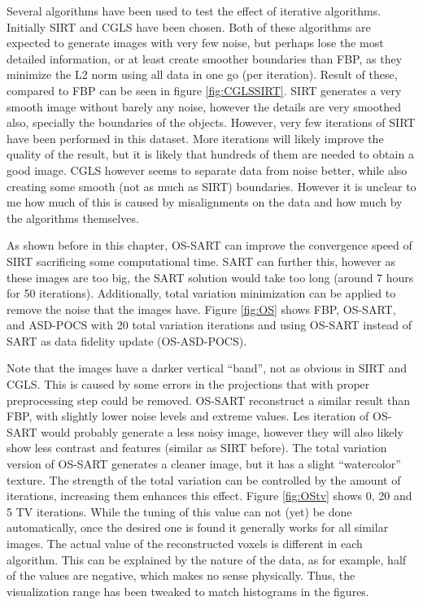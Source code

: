  Several algorithms have been used to test the effect of iterative algorithms.
Initially SIRT and CGLS have been chosen. Both of these algorithms are expected to generate images with very few noise, but perhaps lose the most detailed information, or at least create smoother boundaries than FBP, as they minimize the L2 norm using all data in one go (per iteration). Result of these, compared to FBP can be seen in figure \ref{fig:CGLSSIRT}. SIRT generates a very smooth image without barely any noise, however the details are very smoothed also, specially the boundaries of the objects. However, very few iterations of SIRT have been performed in this dataset. More iterations will likely improve the quality of the result, but it is likely that hundreds of them are needed to obtain a good image. CGLS however seems to separate data from noise better, while also creating some smooth (not as much as SIRT) boundaries. However it is unclear to me how much of this is caused by misalignments on the data and how much by the algorithms themselves.

As shown before in this chapter, OS-SART can improve the convergence speed of SIRT sacrificing some computational time. SART can further this, however as these images are too big, the SART solution would take too long (around 7 hours for 50 iterations). Additionally, total variation minimization can be applied to remove the noise that the images have. Figure \ref{fig:OS} shows FBP, OS-SART, and ASD-POCS with 20 total variation iterations and using OS-SART instead of SART as data fidelity update (OS-ASD-POCS).

Note that the images have a darker vertical ``band'', not as obvious in SIRT and CGLS. This is caused by some errors in the projections that with proper preprocessing step could be removed. OS-SART reconstruct a similar result than FBP, with slightly lower noise levels and extreme values. Les iteration of OS-SART would probably generate a less noisy image, however they will also likely show less contrast and features (similar as SIRT before). The total variation version of OS-SART generates a cleaner image, but it has a slight ``watercolor'' texture. The strength of the total variation can be controlled by the amount of iterations, increasing them enhances this effect. Figure \ref{fig:OStv} shows 0, 20 and 5 TV iterations. While the tuning of this value can not (yet) be done automatically, once the desired one is found it generally works for all similar images. The actual value of the reconstructed voxels is different in each algorithm. This can be explained by the nature of the data, as for example, half of the values are negative, which makes no sense physically. Thus, the visualization range has been tweaked to match histograms in the figures.


